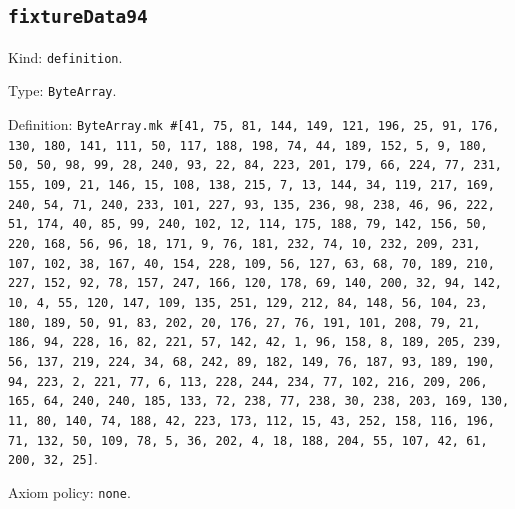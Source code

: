 \documentclass[11pt]{article}
\begin{document}
\subsection*{\texttt{fixtureData94}}
\noindent Kind: \texttt{definition}.\par
\noindent Type: \texttt{ByteArray}.\par
\noindent Definition: \texttt{ByteArray.mk \#[41, 75, 81, 144, 149, 121, 196, 25, 91, 176, 130, 180, 141, 111, 50, 117, 188, 198, 74, 44, 189, 152, 5, 9, 180, 50, 50, 98, 99, 28, 240, 93, 22, 84, 223, 201, 179, 66, 224, 77, 231, 155, 109, 21, 146, 15, 108, 138, 215, 7, 13, 144, 34, 119, 217, 169, 240, 54, 71, 240, 233, 101, 227, 93, 135, 236, 98, 238, 46, 96, 222, 51, 174, 40, 85, 99, 240, 102, 12, 114, 175, 188, 79, 142, 156, 50, 220, 168, 56, 96, 18, 171, 9, 76, 181, 232, 74, 10, 232, 209, 231, 107, 102, 38, 167, 40, 154, 228, 109, 56, 127, 63, 68, 70, 189, 210, 227, 152, 92, 78, 157, 247, 166, 120, 178, 69, 140, 200, 32, 94, 142, 10, 4, 55, 120, 147, 109, 135, 251, 129, 212, 84, 148, 56, 104, 23, 180, 189, 50, 91, 83, 202, 20, 176, 27, 76, 191, 101, 208, 79, 21, 186, 94, 228, 16, 82, 221, 57, 142, 42, 1, 96, 158, 8, 189, 205, 239, 56, 137, 219, 224, 34, 68, 242, 89, 182, 149, 76, 187, 93, 189, 190, 94, 223, 2, 221, 77, 6, 113, 228, 244, 234, 77, 102, 216, 209, 206, 165, 64, 240, 240, 185, 133, 72, 238, 77, 238, 30, 238, 203, 169, 130, 11, 80, 140, 74, 188, 42, 223, 173, 112, 15, 43, 252, 158, 116, 196, 71, 132, 50, 109, 78, 5, 36, 202, 4, 18, 188, 204, 55, 107, 42, 61, 200, 32, 25]}.\par
\noindent Axiom policy: \texttt{none}.\par
\end{document}
